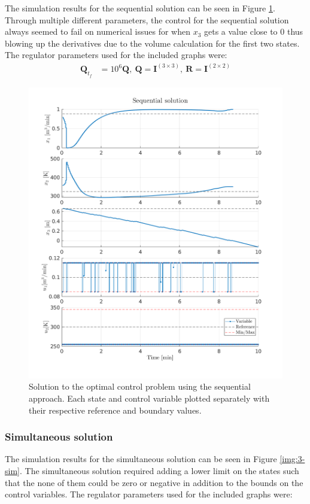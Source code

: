 \documentclass[letterpaper,12pt]{article}
\begin{document}
The simulation results for the sequential solution can be seen in Figure \ref{img:3-seq}. Through multiple different parameters, the control for the sequential solution always seemed to fail on numerical issues for when $x_3$ gets a value close to 0 thus blowing up the derivatives due to the volume calculation for the first two states. The regulator parameters used for the included graphs were:
\begin{equation}
\begin{aligned}
	\mathbf{Q}_{t_f} &= 10^6\mathbf{Q},\ \mathbf{Q} = \mathbf{I}^{(3\times3)},\ \mathbf{R} = \mathbf{I}^{(2\times2)}
\end{aligned}
\end{equation}

\begin{figure}[!htbp]
	\centering
	\includegraphics[width=1\textwidth]{img/3-seq.png}
	\caption{Solution to the optimal control problem using the sequential approach. Each state and control variable plotted separately with their respective reference and boundary values.}
	\label{img:3-seq}
\end{figure}


\subsubsection*{Simultaneous solution}
The simulation results for the simultaneous solution can be seen in Figure \ref*{img:3-sim}. The simultaneous solution required adding a lower limit on the states such that the none of them could be zero or negative in addition to the bounds on the control variables. The regulator parameters used for the included graphs were:
\end{document}
